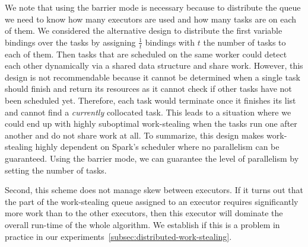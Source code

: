 We note that using the barrier mode is necessary because to distribute the queue we need to know how many executors are used and
how many tasks are on each of them.
We considered the alternative design to distribute the first variable bindings over the tasks by assigning $\frac{1}{t}$ bindings with
$t$ the number of tasks to each of them.
Then tasks that are scheduled on the same worker could detect each other dynamically via a shared data structure and share work.
However, this design is not recommendable because it cannot be determined when a single task should finish and return its resources as
it cannot check if other tasks have not been scheduled yet.
Therefore, each task would terminate once it finishes its list and cannot find a \textit{currently} collocated task.
This leads to a situation where we could end up with highly suboptimal work-stealing when the tasks run one after another and do not
share work at all.
To summarize, this design makes work-stealing highly dependent on Spark's scheduler where no parallelism can be guaranteed.
Using the barrier mode, we can guarantee the level of parallelism by setting the number of tasks.

Second, this scheme does not manage skew between executors.
If it turns out that the part of the work-stealing queue assigned to an executor requires significantly more work than
to the other executors, then this executor will dominate the overall run-time of the whole algorithm.
We establish if this is a problem in practice in our experiments~\cref{subsec:distributed-work-stealing}.
